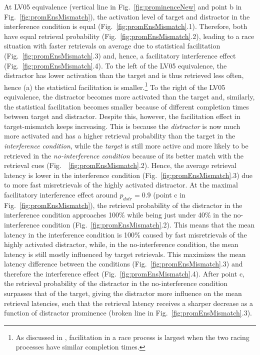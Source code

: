 \documentclass{cambridge7A}\usepackage[]{graphicx}\usepackage[]{color}
\newcommand{\revIV}[1]{#1}
\begin{document}
At LV05 equivalence (vertical line in Fig.~\ref{fig:prominenceNew} and point b in Fig.~\ref{fig:promEnsMismatch}), the activation level of target and distractor in the interference condition is equal (Fig.~\ref{fig:promEnsMismatch}.1). Therefore, both have equal retrieval probability (Fig.~\ref{fig:promEnsMismatch}.2), leading to \revIV{a race situation with} faster retrievals on average due to statistical facilitation (Fig.~\ref{fig:promEnsMismatch}.3) and, hence, a facilitatory interference effect (Fig.~\ref{fig:promEnsMismatch}.4).
To the left of the LV05 equivalence, the distractor has lower activation than the target and is thus retrieved less often, hence (a) the statistical facilitation is smaller.\footnote{
  As discussed in \cite{LogacevVasishth2015}, facilitation in a race process is largest when the two racing processes have similar completion times.} 
To the right of the LV05 equivalence, the distractor becomes more activated than the target and, similarly, the statistical facilitation becomes smaller because of different completion times between target and distractor. Despite this, however, the facilitation effect in target-mismatch keeps increasing. This is because the \emph{distractor} is now much more activated and has a higher retrieval probability than the target in the \emph{interference condition}, while the \revIV{\emph{target} is still more active and more likely to be retrieved in the \emph{no-interference condition} because of its better match with the retrieval cues} (Fig.~~\ref{fig:promEnsMismatch}.2). Hence, the average retrieval latency is lower in the interference condition (Fig.~\ref{fig:promEnsMismatch}.3) due to more fast misretrievals of the highly activated distractor. 
At the maximal facilitatory interference effect around $p_{dstr}=0.9$ (point c in Fig.~\ref{fig:promEnsMismatch}), the retrieval probability of the distractor in the interference condition approaches 100\% while being just under 40\% in the no-interference condition (Fig.~\ref{fig:promEnsMismatch}.2). 
This means that the mean latency in the interference condition is 100\% caused by fast misretrievals of the highly activated distractor, while, in the no-interference condition, the mean latency is still mostly influenced by target retrievals.
This maximizes the mean latency difference between the conditions (Fig.~\ref{fig:promEnsMismatch}.3) and therefore the interference effect (Fig.~\ref{fig:promEnsMismatch}.4). 
After point c, the retrieval probability of the distractor in the no-interference condition surpasses that of the target, giving the distractor more influence on the mean retrieval latencies, such that the retrieval latency receives a sharper decrease as a function of distractor prominence (broken line in Fig.~\ref{fig:promEnsMismatch}.3).
\end{document}

